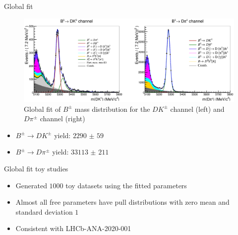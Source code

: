 \documentclass{beamer}
\begin{document}
\begin{frame}{Global fit}
  \begin{figure}
    \centering
    \includegraphics[width = 1.0\textwidth]{Plots/GlobalFit.png}
    \caption{Global fit of $B^\pm$ mass distribution for the $DK^\pm$ channel (left) and $D\pi^\pm$ channel (right)}
  \end{figure}
  \vspace{-0.5cm}
  \begin{itemize}
    \item{$B^\pm\to DK^\pm$ yield: $\SI{2290(59)}{}$}
    \item{$B^\pm\to D\pi^\pm$ yield: $\SI{33113(211)}{}$}
  \end{itemize}
\end{frame}

\begin{frame}{Global fit toy studies}
  \begin{itemize}
    \setlength\itemsep{1.2em}
    \item{Generated $1000$ toy datasets using the fitted parameters}
    \item{Almost all free parameters have pull distributions with zero mean and standard deviation $1$}
    \item{Consistent with LHCb-ANA-2020-001}
  \end{itemize}
\end{frame}
\end{document}
